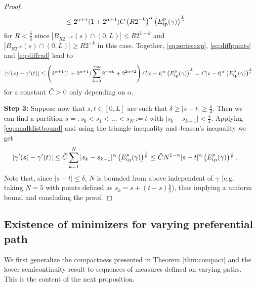 \documentclass{article}
\begin{document}
\begin{proof}
\begin{align}
        &\leq 2^{\alpha+1}(1+2^{\alpha+1})C \left(R2^{-k}\right)^{\alpha} \left(E_{\rm tp}^p(\gamma)\right)^{\frac{1}{p}} \label{eq:diffrad}
    \end{align}
    for $R < \frac{\delta}{4}$ since $|B_{R2^{1-k}}(s)\cap(0,L)| \leq R2^{1-k}$ and $|B_{R2^{-k}}(s)\cap(0,L)| \geq R2^{-k}$ in this case.
    Together, \eqref{eq:seriesexp}, \eqref{eq:diffpoints} and \eqref{eq:diffrad} lead to 
    \begin{align}\label{eq:smalldistbound}
        |\gamma'(s) - \gamma'(t)| \leq \left( 2^{\alpha+1}(1+2^{\alpha+1}) \sum\limits_{k=0}^{+\infty} 2^{-\alpha k} + 2^{2\alpha + 2}\right)C|s-t|^\alpha \left(E_{\rm tp}^p(\gamma)\right)^{\frac{1}{p}} = \Tilde{C}|s-t|^\alpha \left(E_{\rm tp}^p(\gamma)\right)^{\frac{1}{p}}
    \end{align}
    for a constant $\Tilde{C}>0$ only depending on $\alpha$.

    \textbf{Step 3:} Suppose now that  $s,t\in[0,L]$ are such that $\delta \geq |s-t| \geq \frac{\delta}{4}$. Then we can find a partition $s=:s_0 < s_1 < \ldots < s_N := t$ with $|s_k - s_{k-1}| < \frac{\delta}{4}$. Applying \eqref{eq:smalldistbound} and using the triangle inequality and Jensen's inequality we get
    \begin{align*}
        |\gamma'(s) - \gamma'(t)| &\leq  \Tilde{C} \sum\limits_{k=1}^{N} |s_k - s_{k-1}|^\alpha \left(E_{\rm tp}^p(\gamma)\right)^{\frac{1}{p}} \leq \Tilde{C} N^{1-\alpha} |s-t|^\alpha \left(E_{\rm tp}^p(\gamma)\right)^{\frac{1}{p}}.
    \end{align*}
    Note that, since $|s-t| \leq \delta$, $N$ is bounded from above independent of $\gamma$ (e.g. taking $N=5$ with points defined as $s_k=s + (t-s)\frac{k}{5}$), thus implying a uniform bound and concluding the proof.
\end{proof}

\subsection{Existence of minimizers for varying preferential path}\label{WellPsdnVP}


We first generalize the compactness presented in Theorem \ref{thm:compact} and the lower semicontinuity result to sequences of measures defined on varying paths. This is the content of the next proposition.
\end{document}
